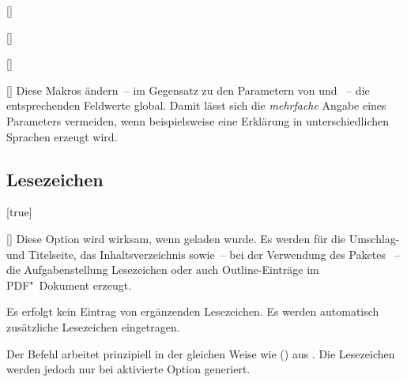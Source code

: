 \begin{Declaration*}{}
\begin{Declaration*}{}
\begin{Declaration*}{}
\begin{Declaration}{[]}
\begin{Declaration}{[]}
\begin{Declaration}{[]}
\begin{Declaration}{[]}
\printdeclarationlist%
%
Diese Makros ändern~-- im Gegensatz zu den Parametern von 
 und ~-- die entsprechenden Feldwerte 
global. Damit lässt sich die \emph{mehrfache} Angabe eines Parameters 
vermeiden, wenn beispielsweise eine Erklärung in unterschiedlichen Sprachen 
erzeugt wird. 
%
%
\end{Declaration}
\end{Declaration}
\end{Declaration}
\end{Declaration}


\subsection{Lesezeichen}
%
%
\begin{Declaration}{}[true]%
\begin{Declaration}{%
  []%
}%
\printdeclarationlist%
%
%
%
%
%
%
%
Diese Option wird wirksam, wenn  geladen wurde. Es werden für 
die Umschlag- und Titelseite, das Inhaltsverzeichnis sowie~-- bei der 
Verwendung des Paketes ~-- die Aufgabenstellung 
Lesezeichen oder auch Outline-Einträge im PDF"~Dokument erzeugt.
%
\begin{values}{}
\itemfalse
  Es erfolgt kein Eintrag von ergänzenden Lesezeichen.
\itemtrue*
  Es werden automatisch zusätzliche Lesezeichen eingetragen.
\end{values}
%
Der Befehl  arbeitet prinzipiell in der gleichen Weise wie 
() aus . Die Lesezeichen 
werden jedoch nur bei aktivierte Option  generiert.
\end{Declaration}
\end{Declaration}




\end{Declaration*}
\end{Declaration*}
\end{Declaration*}
